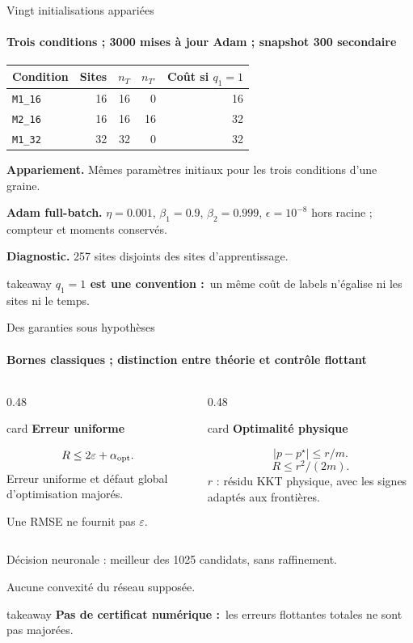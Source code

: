 \documentclass[aspectratio=169,11pt]{beamer}
\newcommand{\sectionlabel}{Question}
\newcommand{\Mone}{\texttt{M1\_16}}
\newcommand{\Mtwo}{\texttt{M2\_16}}
\newcommand{\Mthree}{\texttt{M1\_32}}
\newcommand{\card}[2]{%
  \begin{beamercolorbox}[wd=\linewidth,sep=7pt]{card}
  {\color{teal}\bfseries #1}\par\vspace{4pt}#2
  \end{beamercolorbox}}
\newcommand{\takeaway}[2]{%
  \begin{beamercolorbox}[wd=\linewidth,sep=7pt]{takeaway}
  \small\textbf{#1}\ #2
  \end{beamercolorbox}}
\begin{document}
\renewcommand{\sectionlabel}{04 / Protocole}
\begin{frame}[t]{Vingt initialisations appariées}
\framesubtitle{Trois conditions ; 3000 mises à jour Adam ; snapshot 300 secondaire}
\begin{center}
\renewcommand{\arraystretch}{1.2}
\begin{tabular}{lrrrr}
\toprule
Condition & Sites & $n_T$ & $n_{T'}$ & Coût si $q_1=1$\\
\midrule
\Mone &16&16&0&16\\
\Mtwo &16&16&16&32\\
\Mthree &32&32&0&32\\
\bottomrule
\end{tabular}
\end{center}
\vspace{0.1cm}
\textbf{Appariement.} Mêmes paramètres initiaux pour les trois conditions d'une graine.\par\vspace{0.13cm}
\textbf{Adam full-batch.} $\eta=0.001$, $\beta_1=0.9$, $\beta_2=0.999$,
$\epsilon=10^{-8}$ hors racine ; compteur et moments conservés.\par\vspace{0.13cm}
\textbf{Diagnostic.} 257 sites disjoints des sites d'apprentissage.
\vfill
\takeaway{$q_1=1$ est une convention :}{un même coût de labels n'égalise ni les sites ni le temps.}
\end{frame}

\begin{frame}[t]{Des garanties sous hypothèses}
\framesubtitle{Bornes classiques ; distinction entre théorie et contrôle flottant}
\begin{columns}[T,onlytextwidth]
\begin{column}{0.48\textwidth}
\card{Erreur uniforme}{%
\[R\leq2\varepsilon+\alpha_{\rm opt}.\]
Erreur uniforme et défaut global d'optimisation majorés.\par\vspace{4pt}
Une RMSE ne fournit pas $\varepsilon$.}
\end{column}
\begin{column}{0.48\textwidth}
\card{Optimalité physique}{%
\[|p-p^\star|\leq r/m.\]
\[R\leq r^2/(2m).\]
$r$ : résidu KKT physique, avec les signes adaptés aux frontières.}
\end{column}
\end{columns}
\vspace{0.28cm}
Décision neuronale : meilleur des 1025 candidats, sans raffinement.\par\vspace{0.12cm}
Aucune convexité du réseau supposée.
\vfill
\takeaway{Pas de certificat numérique :}{les erreurs flottantes totales ne sont pas majorées.}
\end{frame}
\end{document}
